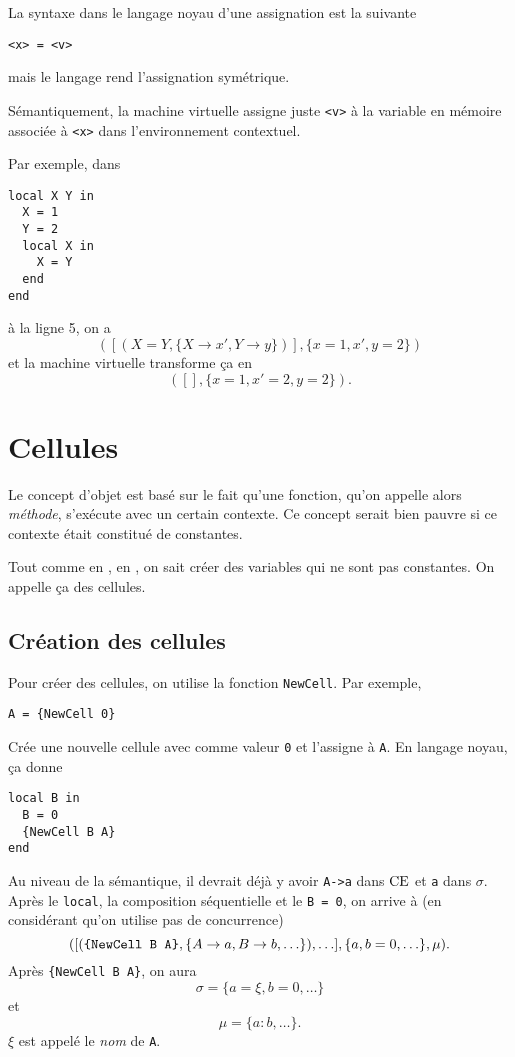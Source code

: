 La syntaxe dans le langage noyau d'une assignation est la suivante
\begin{lstlisting}
<x> = <v>
\end{lstlisting}
mais le langage rend l'assignation symétrique.

Sémantiquement, la machine virtuelle assigne juste \lstinline|<v>| à
la variable en mémoire associée à \lstinline|<x>| dans
l'environnement contextuel.

Par exemple, dans
\begin{lstlisting}
local X Y in
  X = 1
  Y = 2
  local X in
    X = Y
  end
end
\end{lstlisting}
à la ligne 5, on a
\[ ([(X=Y, \{X\to x', Y\to y\})], \{x=1, x', y=2\}) \]
et la machine virtuelle transforme ça en
\[ ([], \{x=1, x'=2, y=2\}). \]

\section{Cellules}
Le concept d'objet est basé sur le fait qu'une fonction,
qu'on appelle alors \emph{méthode},
s'exécute avec un certain contexte.
Ce concept serait bien pauvre si ce contexte était constitué de constantes.

Tout comme en \java{}, en \oz{}, on sait créer des variables qui ne sont
pas constantes. On appelle ça des cellules.

\subsection{Création des cellules}
Pour créer des cellules,
on utilise la fonction \lstinline|NewCell|.
Par exemple,
\begin{lstlisting}
A = {NewCell 0}
\end{lstlisting}
Crée une nouvelle cellule avec comme valeur
\lstinline|0| et l'assigne à \lstinline|A|.
En langage noyau, ça donne
\begin{lstlisting}
local B in
  B = 0
  {NewCell B A}
end
\end{lstlisting}
Au niveau de la sémantique, il devrait déjà y avoir \lstinline|A->a|
dans $\mathrm{CE}{}$ et \lstinline|a| dans $\sigma$.
Après le \lstinline|local|, la composition séquentielle
et le \lstinline|B = 0|, on arrive à
(en considérant qu'on utilise pas de concurrence)
\[ ([(\verb|{NewCell B A}|, \{A\to a, B\to b, \ldots\}), \ldots],
\{a, b = 0, \ldots\}, \mu). \]
Après \lstinline|{NewCell B A}|, on aura
\[ \sigma = \{a = \xi, b = 0, \ldots\} \]
et
\[ \mu = \{a:b, \ldots\}. \]
$\xi$ est appelé le \emph{nom} de \lstinline|A|.

